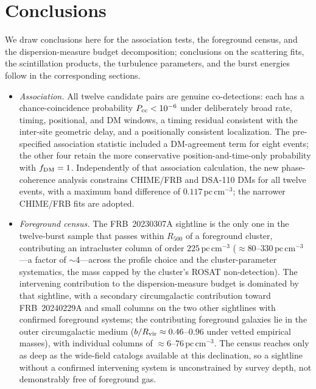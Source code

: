 \section{Conclusions}
\label{sec:conclusions}

We draw conclusions here for the association tests, the foreground census, and
the dispersion-measure budget decomposition; conclusions on the scattering fits, the
scintillation products, the turbulence parameters, and the burst energies follow
in the corresponding sections.

\begin{itemize}
\item \textit{Association.} All twelve candidate pairs are genuine
co-detections: each has a chance-coincidence probability $P_{\rm cc}<10^{-6}$
under deliberately broad rate, timing, positional, and DM windows, a timing
residual consistent with
the inter-site geometric delay, and a positionally consistent localization.
The pre-specified association statistic included a DM-agreement term for eight
events; the other four retain the more conservative position-and-time-only
probability with $f_{\rm DM}=1$. Independently of that association calculation,
the new phase-coherence analysis constrains CHIME/FRB and DSA-110 DMs for all
twelve events, with a maximum band difference of
$0.117\,\mathrm{pc\,cm^{-3}}$; the narrower CHIME/FRB fits are adopted.

\item \textit{Foreground census.} The FRB~20230307A sightline is the only one in
the twelve-burst sample that passes within $R_{500}$ of a foreground cluster,
contributing an intracluster column of order $225\,\mathrm{pc\,cm^{-3}}$
($\approx80$--$330\,\mathrm{pc\,cm^{-3}}$---a factor of $\sim$4---across
the profile choice and the cluster-parameter systematics, the mass capped
by the cluster's ROSAT non-detection).
The intervening contribution to the
dispersion-measure budget is dominated by that sightline, with a secondary
circumgalactic contribution toward FRB~20240229A and small columns on the
two other sightlines with confirmed foreground systems;
the contributing foreground galaxies lie in the outer circumgalactic medium
($b/R_{\rm vir}\approx0.46$--$0.96$ under vetted empirical masses), with
individual columns of $\approx6$--$76\,\mathrm{pc\,cm^{-3}}$. The census
reaches only as deep as the wide-field
catalogs available at this declination, so a sightline without a confirmed
intervening system is unconstrained by survey depth, not demonstrably free of
foreground gas.


\end{itemize}
